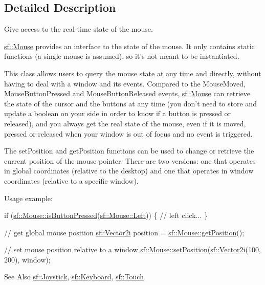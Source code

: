 \subsection{Detailed Description}
Give access to the real-\/time state of the mouse. 

\hyperlink{classsf_1_1_mouse}{sf\-::\-Mouse} provides an interface to the state of the mouse. It only contains static functions (a single mouse is assumed), so it's not meant to be instantiated.

This class allows users to query the mouse state at any time and directly, without having to deal with a window and its events. Compared to the Mouse\-Moved, Mouse\-Button\-Pressed and Mouse\-Button\-Released events, \hyperlink{classsf_1_1_mouse}{sf\-::\-Mouse} can retrieve the state of the cursor and the buttons at any time (you don't need to store and update a boolean on your side in order to know if a button is pressed or released), and you always get the real state of the mouse, even if it is moved, pressed or released when your window is out of focus and no event is triggered.

The set\-Position and get\-Position functions can be used to change or retrieve the current position of the mouse pointer. There are two versions\-: one that operates in global coordinates (relative to the desktop) and one that operates in window coordinates (relative to a specific window).

Usage example\-: 
\begin{DoxyCode}
\textcolor{keywordflow}{if} (\hyperlink{classsf_1_1_mouse_ab647159eb88e369a0332a9c5a7ba6687}{sf::Mouse::isButtonPressed}(\hyperlink{classsf_1_1_mouse_a4fb128be433f9aafe66bc0c605daaa90a7fedad2e16d5c1dcf61de9eff0dbb501}{sf::Mouse::Left}))
\{
    \textcolor{comment}{// left click...}
\}

\textcolor{comment}{// get global mouse position}
\hyperlink{classsf_1_1_vector2}{sf::Vector2i} position = \hyperlink{classsf_1_1_mouse_ac368680f797b7f6e4f50b5b7928c1387}{sf::Mouse::getPosition}();

\textcolor{comment}{// set mouse position relative to a window}
\hyperlink{classsf_1_1_mouse_a1222e16c583be9e3d176d86e0b7817d7}{sf::Mouse::setPosition}(\hyperlink{classsf_1_1_vector2}{sf::Vector2i}(100, 200), window);
\end{DoxyCode}


\begin{DoxySeeAlso}{See Also}
\hyperlink{classsf_1_1_joystick}{sf\-::\-Joystick}, \hyperlink{classsf_1_1_keyboard}{sf\-::\-Keyboard}, \hyperlink{classsf_1_1_touch}{sf\-::\-Touch} 
\end{DoxySeeAlso}


